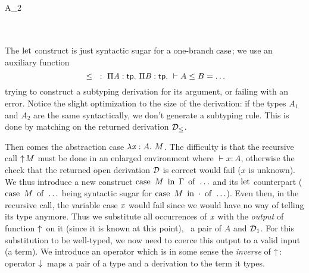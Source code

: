 \documentclass{llncs}
\begin{document}
\begin{mathleft}
  \quad{} \\
  \quad\quad{} {}
   {}
   { {A_2}} \\
  \quad\quad
  \match{\md_{\leq}} \\
  \quad\quad\quad{}
   {} \\
  \quad\quad\quad\caseb{\_}
   {}
\end{mathleft}

\noindent
The $\operatorname{let}$ construct is just syntactic sugar for a one-branch
$\operatorname{case}$; we use an auxiliary function $${}\leq{}\ :\ \Pi{\ensuremath{\text{\textit{A}}}}:{\text{\textsf{tp}}}.\  \Pi{\ensuremath{\text{\textit{B}}}}:{\text{\textsf{tp}}}.\  \vdash A\leq B = \ldots$$ trying to
construct a subtyping derivation for its argument, or failing with an
error. Notice the slight optimization to the size of the derivation:
if the types $A_1$ and $A_2$ are the same syntactically, we don't
generate a subtyping rule. This is done by matching on the returned
derivation $\mathcal D_\leq$.

Then comes the abstraction case $\lambda{\ensuremath{\text{\textit{x}}}}:{A}.\  M$. The difficulty is that
the recursive call $\uparrow\!{M}$ must be done in an enlarged
environment where $\vdash x : A$, otherwise the check that the
returned open derivation $\mathcal D$ is correct would fail ($x$ is
unknown). We thus introduce a new construct $\operatorname{case}\ {{M}\ \operatorname{in}\ {\Gamma}}\ \operatorname{of}\  \ldots$
and its $\operatorname{let}$ counterpart ($\operatorname{case}\ {M}\ \operatorname{of}\  \ldots$ being syntactic
sugar for $\operatorname{case}\ {{M}\ \operatorname{in}\ {\cdot}}\ \operatorname{of}\  \ldots$). Even then, in the recursive
call, the variable case $\text{\textit{x}}$ would fail since we would have no way
of telling its type anymore. Thus we substitute all occurrences of
$\text{\textit{x}}$ with the \emph{output} of function $\uparrow\!{}$ on it (since
it is known at this point), \ie\ a pair of $A$ and $\mathcal D_1$. For this
substitution to be well-typed, we now need to coerce this output to a
valid input (a term). We introduce an operator which is in some sense
the \emph{inverse} of $\uparrow\!{}$: operator $\downarrow\!{}$ maps a pair of a
type and a derivation to the term it types.

\begin{mathleft}
  \quad{}
  {}
\end{mathleft}
\end{document}
